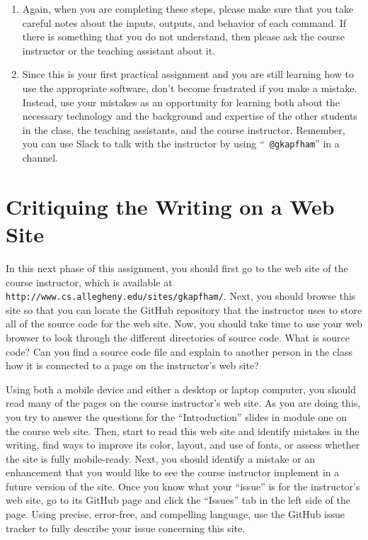 \begin{enumerate}
  \item Again, when you are completing these steps, please make sure that you take careful notes about the inputs,
    outputs, and behavior of each command. If there is something that you do not understand, then please ask the course
    instructor or the teaching assistant about it.

  \item Since this is your first practical assignment and you are still learning how to use the appropriate software,
    don't become frustrated if you make a mistake. Instead, use your mistakes as an opportunity for learning both about
    the necessary technology and the background and expertise of the other students in the class, the teaching
    assistants, and the course instructor. Remember, you can use Slack to talk with the instructor by using ``{\tt
    @gkapfham}'' in a channel.

\end{enumerate}

\vspace*{-.15in}
\section*{Critiquing the Writing on a Web Site}

In this next phase of this assignment, you should first go to the web site of the course instructor, which is available
at {\tt http://www.cs.allegheny.edu/sites/gkapfham/}. Next, you should browse this site so that you can locate the
GitHub repository that the instructor uses to store all of the source code for the web site. Now, you should take time
to use your web browser to look through the different directories of source code. What is source code? Can you find a
source code file and explain to another person in the class how it is connected to a page on the instructor's web site?

Using both a mobile device and either a desktop or laptop computer, you should read many of the pages on the course
instructor's web site. As you are doing this, you try to answer the questions for the ``Introduction'' slides in module
one on the course web site. Then, start to read this web site and identify mistakes in the writing, find ways to improve
its color, layout, and use of fonts, or assess whether the site is fully mobile-ready. Next, you should identify a
mistake or an enhancement that you would like to see the course instructor implement in a future version of the site.
Once you know what your ``issue'' is for the instructor's web site, go to its GitHub page and click the ``Issues'' tab
in the left side of the page. Using precise, error-free, and compelling language, use the GitHub issue tracker to fully
describe your issue concerning this site.

